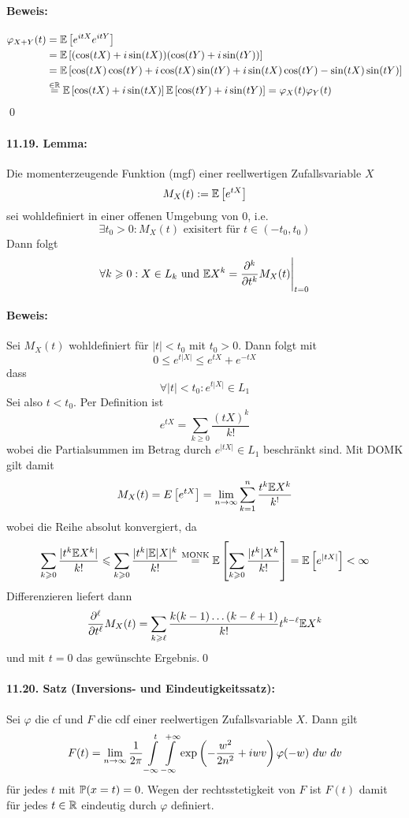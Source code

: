 \documentclass[11pt]{report}
\begin{document}
\paragraph{Beweis:}
\begin{align*}
    \varphi_{X+Y}(t)&=\mathbb{E}\left[e^{itX}e^{itY}\right] \\
    &=\mathbb{E}\left[(\cos(tX)+i\sin(tX))(\cos(tY)+i\sin(tY))\right] \\
    &=\mathbb{E}\left[\cos(tX)\cos(tY)+i\cos(tX)\sin(tY)+i\sin(tX)\cos(tY)-\sin(tX)\sin(tY)\right] \\
    &\overset{\in\mathbb{R}}{=}\mathbb{E}\left[\cos(tX)+i\sin(tX)\right]\mathbb{E}\left[\cos(tY)+i\sin(tY)\right]=\varphi_X(t)\varphi_Y(t)
\end{align*}\qed

\paragraph{11.19. Lemma:} Die momenterzeugende Funktion (mgf) einer reellwertigen Zufallsvariable $X$
$$M_X(t):=\mathbb{E}\left[e^{tX}\right]$$
sei wohldefiniert in einer offenen Umgebung von $0$, i.e. 
$$\exists t_0>0:M_X(t)\text{ exisitert f\"ur } t\in(-t_0,t_0)$$
Dann folgt
$$\forall k\geqslant0:X\in L_k \text{ und }\mathbb{E} X^k=\dfrac{\partial^k}{\partial t^k}M_X(t)\Bigg|_{t=0}$$

\paragraph{Beweis:} Sei $M_X(t)$ wohldefiniert f\"ur $|t|<t_0$ mit $t_0>0$. Dann folgt mit
$$0\leq e^{t|X|}\leq e^{tX}+e^{-tX}$$
dass
$$\forall |t|<t_0:e^{t|X|}\in L_1$$
Sei also $t<t_0$. Per Definition ist 
$$e^{tX}=\sum_{k\geq0}\dfrac{(tX)^k}{k!}$$
wobei die Partialsummen im Betrag durch $e^{|tX|}\in L_1$ beschr\"ankt sind. Mit DOMK gilt damit 
$$M_X(t)=\\E\left[e^{tX}\right]=\lim_{n\to\infty}\sum_{k=1}^n\dfrac{t^k\mathbb{E} X^k}{k^!}$$
wobei die Reihe absolut konvergiert, da
$$\sum_{k\geqslant0}\dfrac{|t^k\mathbb{E} X^k|}{k!}\leqslant\sum_{k\geqslant0}\dfrac{|t^k|\mathbb{E} |X|^k}{k!}\overset{\text{MONK}}{=}\mathbb{E}\left[\sum_{k\geqslant0}\dfrac{|t^k|X^k}{k!}\right]=\mathbb{E}\left[ e^{|tX|}\right]<\infty$$
Differenzieren liefert dann
$$\dfrac{\partial^\ell}{\partial t^\ell}M_X(t)=\sum_{k\geqslant\ell}\dfrac{k(k-1)\hdots(k-\ell+1)}{k!}t^{k-\ell}\mathbb{E} X^k$$
und mit $t=0$ das gew\"unschte Ergebnis.\qed

\paragraph{11.20. Satz (Inversions- und Eindeutigkeitssatz):} Sei $\varphi$ die cf und $F$ die cdf einer reelwertigen Zufallsvariable $X$. Dann gilt
$$F(t)=\lim_{n\to\infty}\dfrac{1}{2\pi}\int\displaylimits_{-\infty}^t\int\displaylimits_{-\infty}^{+\infty}\exp\left(-\dfrac{w^2}{2n^2}+iwv\right)\varphi(-w)\ dw\ dv$$
f\"ur jedes $t$ mit $\mathbb{P}(x=t)=0$. Wegen der rechtsstetigkeit von $F$ ist $F(t)$ damit f\"ur jedes $t\in\mathbb{R}$ eindeutig durch $\varphi$ definiert. 
\end{document}
